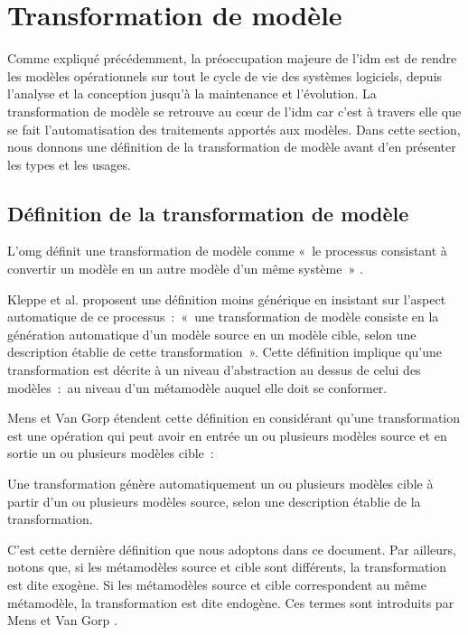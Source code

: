 \section{Transformation de modèle}
Comme expliqué précédemment, la préoccupation majeure de l'\gls{idm} est de 
rendre les modèles opérationnels sur tout le cycle de vie des systèmes 
logiciels, depuis l'analyse et la conception jusqu'à la maintenance et 
l'évolution. La transformation de modèle se retrouve au cœur de l'\gls{idm} car 
c'est à travers elle que se fait l'automatisation des traitements apportés aux 
modèles. Dans cette section, nous donnons une définition de la 
transformation de modèle avant d'en présenter les types et les usages.

\subsection{Définition de la transformation de modèle}
L'\gls{omg} définit une transformation de modèle comme «~le processus consistant à 
convertir un modèle en un autre modèle d'un même système~» \cite{omg2011meta}. 

Kleppe et al. \cite{kleppe2003mda} proposent une définition moins générique en insistant sur l'aspect automatique de ce processus~:~«~une transformation de modèle 
consiste en la génération automatique d'un modèle source en un modèle cible, 
selon une description établie de cette transformation~». Cette définition 
implique qu'une transformation est décrite à un niveau 
d'abstraction au dessus de celui des modèles~:~au niveau d'un métamodèle auquel elle doit se conformer. 

Mens et Van Gorp \cite{mens2006taxonomy} étendent cette définition en considérant qu'une 
transformation est une opération qui peut avoir en entrée un ou plusieurs 
modèles source et en sortie un ou plusieurs modèles cible~: 

\begin{definition}
Une transformation génère automatiquement un ou plusieurs modèles cible à partir 
d'un ou plusieurs modèles source, selon une description établie de la 
transformation. 
\end{definition}

C'est cette dernière définition que nous adoptons dans ce document. Par 
ailleurs, notons que, si les métamodèles source et cible sont différents, la 
transformation est dite exogène. Si les métamodèles source et cible 
correspondent au même métamodèle, la transformation est dite endogène. Ces 
termes sont introduits par Mens et Van Gorp \cite{mens2006taxonomy}.

